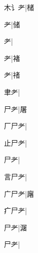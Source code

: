 \begin{multicols}{2}
{{\cjk{}木{讠}耂}\mktsJzrVerticalBar{}{\cjk{}{\cnsym{}　}{\cnsym{}　}{\cnsym{}　}}|{\cjk{}槠}\par
{耂}\mktsJzrVerticalBar{}{\cjk{}{\cnsym{}　}{\cnsym{}　}{\cnsym{}　}}|{\cjk{}储}\par
{耂}\mktsJzrVerticalBar{}{\cjk{}{\cnsym{}　}{\cnsym{}　}{\cnsym{}　}}|{}\par
{耂}\mktsJzrVerticalBar{}{\cjk{}{\cnsym{}　}{\cnsym{}　}{\cnsym{}　}}|{\cjk{}褚}\par
{耂}\mktsJzrVerticalBar{}{\cjk{}{\cnsym{}　}{\cnsym{}　}{\cnsym{}　}}|{\cjk{}禇}\par
{\cjk{}{\cnsym{}　}聿耂}\mktsJzrVerticalBar{}{\cjk{}{\cnsym{}　}{\cnsym{}　}{\cnsym{}　}}|{}\par
{\cjk{}{\cnsym{}　}尸耂}\mktsJzrVerticalBar{}{\cjk{}{\cnsym{}　}{\cnsym{}　}{\cnsym{}　}}|{\cjk{}屠}\par
{\cjk{}厂尸耂}\mktsJzrVerticalBar{}{\cjk{}{\cnsym{}　}{\cnsym{}　}{\cnsym{}　}}|{}\par
{\cjk{}止尸耂}\mktsJzrVerticalBar{}{\cjk{}{\cnsym{}　}{\cnsym{}　}{\cnsym{}　}}|{}\par
{尸耂}\mktsJzrVerticalBar{}{\cjk{}{\cnsym{}　}{\cnsym{}　}{\cnsym{}　}}|{}\par
{\cjk{}言尸耂}\mktsJzrVerticalBar{}{\cjk{}{\cnsym{}　}{\cnsym{}　}{\cnsym{}　}}|{}\par
{\cjk{}广尸耂}\mktsJzrVerticalBar{}{\cjk{}{\cnsym{}　}{\cnsym{}　}{\cnsym{}　}}|{\cjk{}廜}\par
{\cjk{}疒尸耂}\mktsJzrVerticalBar{}{\cjk{}{\cnsym{}　}{\cnsym{}　}{\cnsym{}　}}|{}\par
{尸耂}\mktsJzrVerticalBar{}{\cjk{}{\cnsym{}　}{\cnsym{}　}{\cnsym{}　}}|{\cjk{}潳}\par
{尸耂}\mktsJzrVerticalBar{}{\cjk{}{\cnsym{}　}{\cnsym{}　}{\cnsym{}　}}|{}\par
}
\end{multicols}
